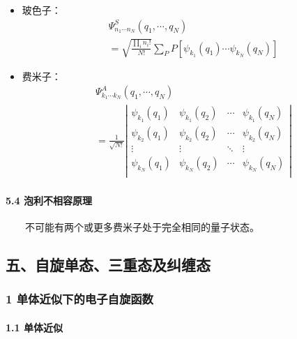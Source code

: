 \documentclass[UTF8,twocolumn]{ctexart}
\providecommand{\tightlist}{%
  \setlength{\itemsep}{0pt}\setlength{\parskip}{0pt}}
\let\oldparagraph\paragraph
\renewcommand{\paragraph}[1]{\oldparagraph{#1}\mbox{}}
\begin{document}
\begin{itemize}
\tightlist
\item
  玻色子：
  $$\begin{aligned}
    &\Psi_{n_1\cdots n_N}^S(q_1,\cdots,q_N) \\
    &=\sqrt{\frac{\prod_in_i!}{N!}}\sum_PP[\psi_{k_1}(q_1)\cdots\psi_{k_N}(q_N)]
  \end{aligned}$$
\item
  费米子：
  $$\begin{aligned}
    &\Psi_{k_1\cdots k_N}^A(q_1,\cdots,q_N) \\
    &=\frac{1}{\sqrt{N!}}\left|\begin{matrix}
    \psi_{k_1}(q_1) & \psi_{k_1}(q_2) & \cdots & \psi_{k_1}(q_N) \\
    \psi_{k_2}(q_1) & \psi_{k_2}(q_2) & \cdots & \psi_{k_2}(q_N) \\
    \vdots & \vdots & \ddots & \vdots \\
    \psi_{k_N}(q_1) & \psi_{k_N}(q_2) & \cdots & \psi_{k_N}(q_N) \\
  \end{matrix}\right|\end{aligned}$$
\end{itemize}

\hypertarget{ux6ce1ux5229ux4e0dux76f8ux5bb9ux539fux7406}{%
\paragraph{ 5.4
泡利不相容原理}\label{ux6ce1ux5229ux4e0dux76f8ux5bb9ux539fux7406}}

  不可能有两个或更多费米子处于完全相同的量子状态。

\hypertarget{ux4e94ux81eaux65cbux5355ux6001ux4e09ux91cdux6001ux53caux7ea0ux7f20ux6001}{%
\subsection{五、自旋单态、三重态及纠缠态}\label{ux4e94ux81eaux65cbux5355ux6001ux4e09ux91cdux6001ux53caux7ea0ux7f20ux6001}}

\hypertarget{ux5355ux4f53ux8fd1ux4f3cux4e0bux7684ux7535ux5b50ux81eaux65cbux51fdux6570}{%
\subsubsection{1
单体近似下的电子自旋函数}\label{ux5355ux4f53ux8fd1ux4f3cux4e0bux7684ux7535ux5b50ux81eaux65cbux51fdux6570}}

\hypertarget{ux5355ux4f53ux8fd1ux4f3c}{%
\paragraph{ 1.1 单体近似}\label{ux5355ux4f53ux8fd1ux4f3c}}
\end{document}
